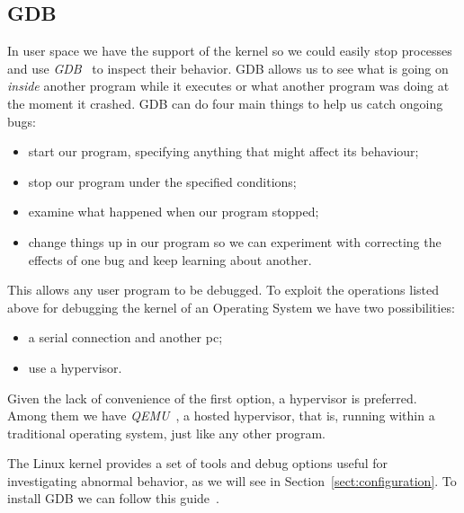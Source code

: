\documentclass{masterthesis}
\newcommand{\refToSection}[1]{Section~\ref{sect:#1}\xspace}
\begin{document}
\subsection{GDB}
\label{subsect:gdb}
In user space we have the support of the kernel so we could easily stop processes and use \emph{GDB}~\cite{stallman1988debugging} to inspect their behavior.
GDB allows us to see what is going on \emph{inside} another program while it executes or what another program was doing at the moment it crashed.
GDB can do four main things to help us catch ongoing bugs:
\begin{itemize}
\item start our program, specifying anything that might affect its behaviour;
\item stop our program under the specified conditions;
\item examine what happened when our program stopped;
\item change things up in our program so we can experiment with correcting the effects of one bug and keep learning about another.
\end{itemize}
This allows any user program to be debugged.
To exploit the operations listed above for debugging the kernel of an Operating System we have two possibilities:
\begin{itemize}
\item a serial connection and another pc;
\item use a hypervisor.
\end{itemize}
Given the lack of convenience of the first option, a hypervisor is preferred.
Among them we have \emph{QEMU}~\cite{bellard2005QEMU}, a hosted hypervisor, that is, running within a traditional operating system, just like any other program.

The Linux kernel provides a set of tools and debug options useful for investigating abnormal behavior, as we will see in \refToSection{configuration}.
To install GDB we can follow this guide~\cite{gdbinstall}. 
\end{document}
